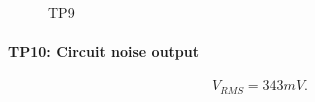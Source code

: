 \documentclass[12pt]{article}
\begin{document}
        \begin{figure}[H]
          \centering
          \qquad
          \caption{TP9}
          \label{fig:tp9_waveforms}
        \end{figure}
        \setcounter{subfigure}{0}

      \newpage
      \paragraph{TP10: Circuit noise output}

        \begin{equation}
          V_{RMS} = 343mV.\nonumber
        \end{equation}
\end{document}
